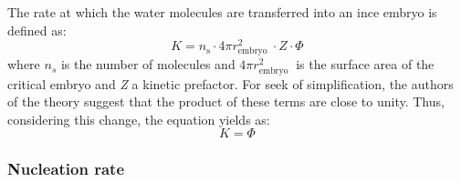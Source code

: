 \noindent The rate at which the water molecules are transferred into an ince embryo is defined as:
\begin{equation}
	\label{2.24}
	K=n_{\mathrm{s}} \cdot 4 \pi r_{\text {embryo }}^{2} \cdot Z \cdot \Phi
\end{equation}
where $n_s$ is the number of molecules and $4 \pi r_{\text {embryo }}^{2}$ is the surface area of the critical embryo and \textit{Z} a kinetic prefactor. For seek of simplification, the authors of the theory suggest that the product of these terms are close to unity. Thus, considering this change, the equation yields as:
\begin{equation}
	\label{2.25}
	K=\Phi
\end{equation}

\subsubsection*{Nucleation rate}

